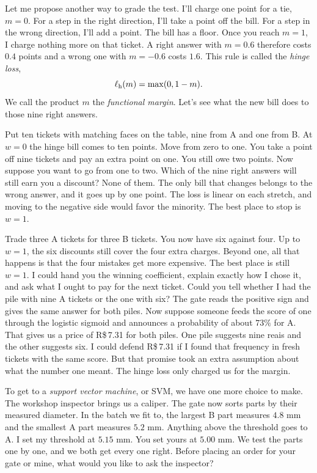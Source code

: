 Let me propose another way to grade the test. I'll charge one point for a tie, $m=0$. For a step in the right direction, I'll take a point off the bill. For a step in the wrong direction, I'll add a point. The bill has a floor. Once you reach $m=1$, I charge nothing more on that ticket. A right answer with $m=0.6$ therefore costs $0.4$ points and a wrong one with $m=-0.6$ costs $1.6$. This rule is called the \emph{hinge loss},
\[
                  \ell_{\rm h}(m)=\max(0,1-m).
\]
We call the product $m$ the \emph{functional margin}. Let's see what the new bill does to those nine right answers.

\perdasmargem

Put ten tickets with matching faces on the table, nine from A and one from B. At $w=0$ the hinge bill comes to ten points. Move from zero to one. You take a point off nine tickets and pay an extra point on one. You still owe two points. Now suppose you want to go from one to two. Which of the nine right answers will still earn you a discount? None of them. The only bill that changes belongs to the wrong answer, and it goes up by one point. The loss is linear on each stretch, and moving to the negative side would favor the minority. The best place to stop is $w=1$.

Trade three A tickets for three B tickets. You now have six against four. Up to $w=1$, the six discounts still cover the four extra charges. Beyond one, all that happens is that the four mistakes get more expensive. The best place is still $w=1$. I could hand you the winning coefficient, explain exactly how I chose it, and ask what I ought to pay for the next ticket. Could you tell whether I had the pile with nine A tickets or the one with six? The gate reads the positive sign and gives the same answer for both piles. Now suppose someone feeds the score of one through the logistic sigmoid and announces a probability of about $73\%$ for A. That gives us a price of R\$\,7.31 for both piles. One pile suggests nine reais and the other suggests six. I could defend R\$\,7.31 if I found that frequency in fresh tickets with the same score. But that promise took an extra assumption about what the number one meant. The hinge loss only charged us for the margin.

To get to a \emph{support vector machine}, or SVM, we have one more choice to make. The workshop inspector brings us a caliper. The gate now sorts parts by their measured diameter. In the batch we fit to, the largest B part measures $4.8$ mm and the smallest A part measures $5.2$ mm. Anything above the threshold goes to A. I set my threshold at $5.15$ mm. You set yours at $5.00$ mm. We test the parts one by one, and we both get every one right. Before placing an order for your gate or mine, what would you like to ask the inspector?

